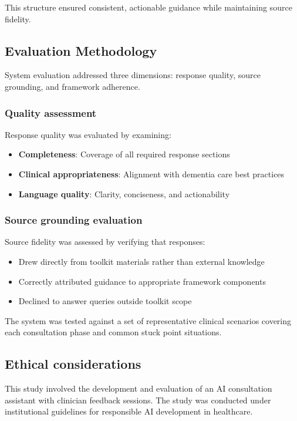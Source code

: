 This structure ensured consistent, actionable guidance while maintaining source fidelity.

\subsection{Evaluation Methodology}\label{sec:evaluation}

System evaluation addressed three dimensions: response quality, source grounding, and framework adherence.

\subsubsection{Quality assessment}

Response quality was evaluated by examining:
\begin{itemize}
    \item \textbf{Completeness}: Coverage of all required response sections
    \item \textbf{Clinical appropriateness}: Alignment with dementia care best practices
    \item \textbf{Language quality}: Clarity, conciseness, and actionability
\end{itemize}

\subsubsection{Source grounding evaluation}

Source fidelity was assessed by verifying that responses:
\begin{itemize}
    \item Drew directly from toolkit materials rather than external knowledge
    \item Correctly attributed guidance to appropriate framework components
    \item Declined to answer queries outside toolkit scope
\end{itemize}

The system was tested against a set of representative clinical scenarios covering each consultation phase and common stuck point situations.

\subsection{Ethical considerations}\label{sec:ethics}

This study involved the development and evaluation of an AI consultation assistant with clinician feedback sessions. The study was conducted under institutional guidelines for responsible AI development in healthcare.

